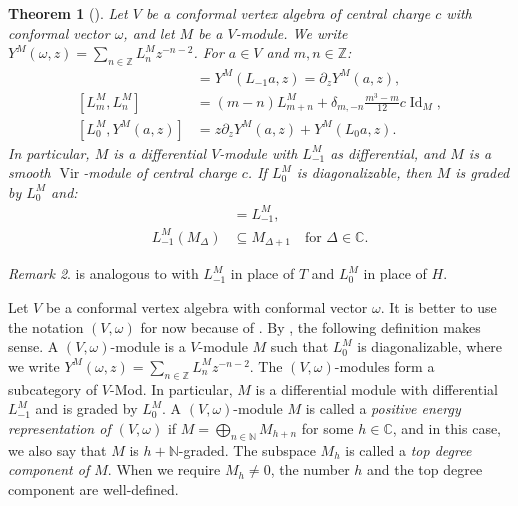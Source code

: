 \documentclass[a4paper, 12pt, reqno]{amsart}
\newtheorem{theorem}{Theorem}[section]
\theoremstyle{remark}
\newtheorem{remark}[theorem]{Remark}
\DeclareMathOperator{\Vir}{Vir}
\DeclareMathOperator{\Id}{Id}
\begin{document}
\begin{theorem}[{\cite[Proposition 4.1.5 and (4.1.18)]{lepowsky_introduction_2004}}]
  \label{thr:27}
  Let $V$ be a conformal vertex algebra of central charge $c$ with conformal vector $\omega$, and let $M$ be a $V$-module.
  We write $Y^M(\omega, z) = \sum_{n \in \mathbb{Z}}L^M_nz^{-n - 2}$.
  For $a \in V$ and $m, n \in \mathbb{Z}$:
  \begin{align*}
    [L^M_{-1}, Y^M(a, z)] &= Y^M(L_{-1}a, z) = \partial_zY^M(a, z), \\
    [L^M_m, L^M_n] &= (m - n)L^M_{m + n} + \delta_{m, -n}\frac{m^3 - m}{12}c\Id_M, \\
    [L^M_0, Y^M(a, z)] &= z\partial_zY^M(a, z) + Y^M(L_0a, z).
  \end{align*}
  In particular, $M$ is a differential $V$-module with $L_{-1}^M $ as differential, and $M$ is a smooth $\Vir$-module of central charge $c$.
  If $L^M_0$ is diagonalizable, then $M$ is graded by $L_0^M$ and:
  \begin{align*}
    [L_0^M, L_{-1}^M] &= L_{-1}^M, \\
    L^M_{-1}(M_{\Delta}) &\subseteq M_{\Delta + 1} \quad \text{for $\Delta \in \mathbb{C}$}.
  \end{align*}
\end{theorem}

\begin{remark}
  \label{rmk:24}
   is analogous to  with $L_{-1}^M$ in place of $T$ and $L_0^M$ in place of $H$.
\end{remark}

Let $V$ be a conformal vertex algebra with conformal vector $\omega$.
It is better to use the notation $(V, \omega)$ for now because of .
By , the following definition makes sense. A $(V, \omega)$-module is a $V$-module $M$ such that $L^M_0$ is diagonalizable, where we write $Y^M(\omega, z) = \sum_{n \in \mathbb{Z}}L^M_nz^{-n - 2}$.
The $(V, \omega)$-modules form a subcategory of $V$-Mod.
In particular, $M$ is a differential module with differential $L^M_{-1}$ and is graded by $L^M_0$.
A $(V, \omega)$-module $M$ is called a \emph{positive energy representation of $(V, \omega)$} if $M = \bigoplus_{n \in \mathbb{N}}M_{h + n}$ for some $h \in \mathbb{C}$, and in this case, we also say that $M$ is $h + \mathbb{N}$-graded.
The subspace $M_h$ is called a \emph{top degree component of $M$}.
When we require $M_h \neq 0$, the number $h$ and the top degree component are well-defined.
\end{document}
